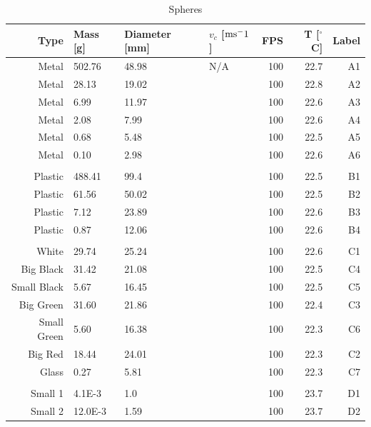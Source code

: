 \documentclass[11pt,a4paper]{article}
\begin{document}
  \begin{table}[H]
    \center
    \begin{tabular}{ r | l  l l  r  r  r }
      
      Type       & Mass [g] & Diameter [mm] & $v_c$ [$\textup{ms}^-1$] & FPS    & T [$^\circ$C]   & Label \\ 
      \hline
      Metal       & 502.76  & 48.98         & N/A & 100    & 22.7   & A1  \\ 
      Metal       & 28.13   & 19.02         & & 100    & 22.8   & A2  \\  
      Metal       & 6.99    & 11.97         & & 100    & 22.6   & A3  \\ 
      Metal       & 2.08    & 7.99          & & 100    & 22.6   & A4  \\ 
      Metal       & 0.68    & 5.48          & & 100    & 22.5   & A5  \\ 
      Metal       & 0.10    & 2.98          & & 100    & 22.6   & A6  \\ 
      \\
      Plastic     & 488.41  & 99.4          & & 100    & 22.5   & B1  \\ 
      Plastic     & 61.56   & 50.02         & & 100    & 22.5   & B2  \\ 
      Plastic     & 7.12    & 23.89         & & 100    & 22.6   & B3  \\ 
      Plastic     & 0.87    & 12.06         & & 100    & 22.6   & B4  \\ 
      \\
      White       & 29.74   & 25.24         & & 100    & 22.6   & C1  \\ 
      Big Black   & 31.42   & 21.08         & & 100    & 22.5   & C4  \\ 
      Small Black & 5.67    & 16.45         & & 100    & 22.5   & C5  \\ 
      Big Green   & 31.60   & 21.86         & & 100    & 22.4   & C3  \\ 
      Small Green & 5.60    & 16.38         & & 100    & 22.3   & C6  \\ 
      Big Red     & 18.44   & 24.01         & & 100    & 22.3   & C2  \\ 
      Glass       & 0.27    & 5.81          & & 100    & 22.3   & C7  \\ 
      \\
      Small 1     & 4.1E-3  & 1.0           & & 100    & 23.7   & D1  \\ 
      Small 2     & 12.0E-3 & 1.59          & & 100    & 23.7   & D2  \\    
    \end{tabular}
    \caption{Spheres}
  \end{table}
\end{document}
